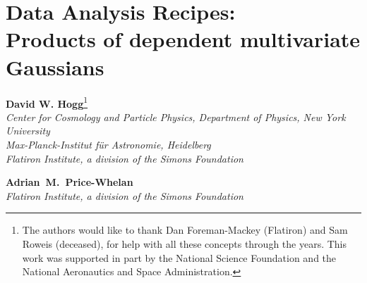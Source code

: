 \newcommand{\va}{\vector{a}}
\newcommand{\vb}{\vector{b}}
\newcommand{\vm}{\vector{m}}
\newcommand{\vx}{\vector{x}}
\newcommand{\vy}{\vector{y}}
\newcommand{\vz}{\vector{z}}
\newcommand{\vmu}{\vector{\mu}}
\newcommand{\veta}{\vector{\eta}}
\newcommand{\vtheta}{\vector{\theta}}
\newcommand{\tA}{\tensor{A}}
\newcommand{\tB}{\tensor{B}}
\newcommand{\tC}{\tensor{C}}
\newcommand{\tD}{\tensor{D}}
\newcommand{\tI}{\tensor{I}}
\newcommand{\tQ}{\tensor{Q}}
\newcommand{\tS}{\tensor{S}}
\newcommand{\tH}{\tensor{H}}
\newcommand{\tLambda}{\tensor{\Lambda}}
\newcommand{\mM}{\matrix{M}}
\newcommand{\mN}{\matrix{N}}
\newcommand{\mU}{\matrix{U}}
\newcommand{\mV}{\matrix{V}}
\newcommand{\bP}{\ensuremath{\textrm{\ding{170}}}} %
\newcommand{\bH}{\ensuremath{\textrm{\ding{114}}}} %

\addtolength{\topmargin}{-0.75in}
\addtolength{\textheight}{1.5in}
\setlength{\parindent}{\baselineskip}
\raggedbottom\sloppy\sloppypar\frenchspacing

\usepackage{color}
\newcommand{\todo}[1]{\textcolor{BrickRed}{[TODO: #1]}}
\newcommand{\bl}[1]{\textcolor{red}{[BL says: #1]}}
\newcommand{\hogg}[1]{\textcolor{magenta}{[Hogg says: #1]}}



\section*{Data Analysis Recipes:\\ Products of dependent multivariate Gaussians}

\noindent\textbf{David W. Hogg}\footnote{%
The authors would like to thank
  Dan Foreman-Mackey (Flatiron) and
  Sam Roweis (deceased),
for help with all these concepts through the years.
This work was supported in part by the National Science Foundation
and the National Aeronautics and Space Administration.
}\\
{\footnotesize%
  \textsl{Center for Cosmology and Particle Physics, Department of Physics, New York University}\\
  \textsl{Max-Planck-Institut f\"ur Astronomie, Heidelberg}\\
  \textsl{Flatiron Institute, a division of the Simons Foundation}%
}

\medskip\noindent\textbf{Adrian~M.~Price-Whelan}\\
{\footnotesize%
  \textsl{Flatiron Institute, a division of the Simons Foundation}%
}

